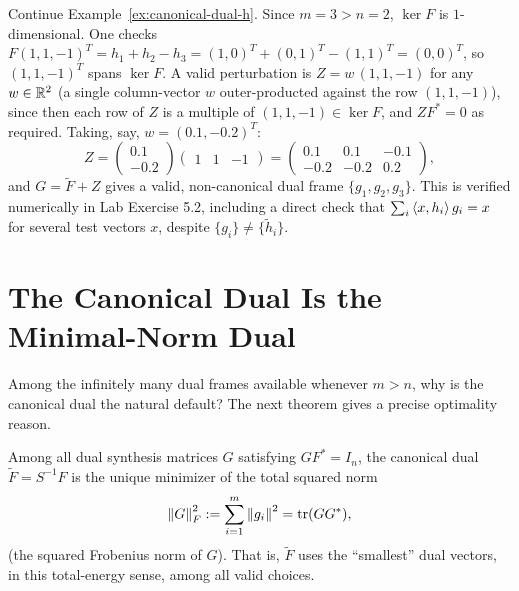 \begin{examplebox}[title={Example 5.2: An alternate dual of the non-tight frame}]
\label{ex:alternate-dual-h}
Continue Example~\ref{ex:canonical-dual-h}. Since $m=3>n=2$, $\ker F$
is $1$-dimensional. One checks $F(1,1,-1)^T = h_1+h_2-h_3 =
(1,0)^T+(0,1)^T-(1,1)^T=(0,0)^T$, so $(1,1,-1)^T$ spans $\ker F$. A
valid perturbation is $Z = w\,(1,1,-1)$ for any $w\in\mathbb{R}^2$ (a single
column-vector $w$ outer-producted against the row $(1,1,-1)$), since
then each row of $Z$ is a multiple of $(1,1,-1)\in\ker F$, and
$ZF^*=0$ as required. Taking, say, $w=(0.1,-0.2)^T$:
\[
  Z = \begin{pmatrix}0.1\\-0.2\end{pmatrix}\begin{pmatrix}1&1&-1\end{pmatrix}
  = \begin{pmatrix}0.1&0.1&-0.1\\-0.2&-0.2&0.2\end{pmatrix},
\]
and $G = \tilde F + Z$ gives a valid, non-canonical dual frame
$\{g_1,g_2,g_3\}$. This is verified numerically in
Lab Exercise 5.2, including a direct check
that $\sum_i\left\langle x, h_i \right\rangle g_i=x$ for several test vectors $x$, despite
$\{g_i\}\ne\{\tilde h_i\}$.
\end{examplebox}

\section{The Canonical Dual Is the Minimal-Norm Dual}
\label{sec:minimal-norm}

Among the infinitely many dual frames available whenever $m>n$, why is
the canonical dual the natural default? The next theorem gives a precise
optimality reason.

\begin{theorem}
\label{thm:canonical-minimal-norm}
Among all dual synthesis matrices $G$ satisfying $GF^*=I_n$, the
canonical dual $\tilde F = S^{-1}F$ is the unique minimizer of the total
squared norm
\[
  \left\| G \right\|_F^2 := \sum_{i=1}^m \left\| g_i \right\|^2 = \operatorname{tr}(GG^*),
\]
(the squared Frobenius norm of $G$). That is, $\tilde F$ uses the
``smallest'' dual vectors, in this total-energy sense, among all valid
choices.
\end{theorem}

